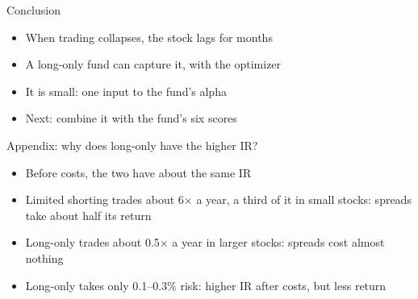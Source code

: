 \documentclass[aspectratio=169,11pt]{beamer}
\begin{document}
\begin{frame}{Conclusion}
\begin{itemize}
\item When trading collapses, the stock lags for months
\item A long-only fund can capture it, with the optimizer
\item It is small: one input to the fund's alpha
\item Next: combine it with the fund's six scores
\end{itemize}
\end{frame}

\begin{frame}[plain]\vfill{}\vfill\end{frame}

\begin{frame}{Appendix: why does long-only have the higher IR?}
\centering
\small
{}

\medskip
\raggedright
\begin{itemize}
\item Before costs, the two have about the same IR
\item Limited shorting trades about 6$\times$ a year, a third of it in small stocks: spreads take about half its return
\item Long-only trades about 0.5$\times$ a year in larger stocks: spreads cost almost nothing
\item Long-only takes only 0.1--0.3\% risk: higher IR after costs, but less return
\end{itemize}
\end{frame}
\end{document}
